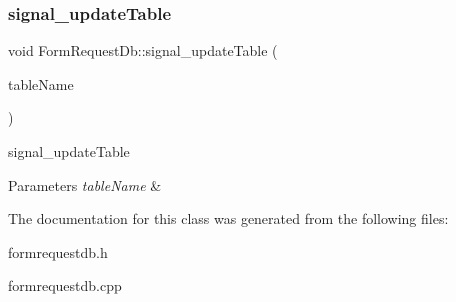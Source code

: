 \subsubsection{\texorpdfstring{signal\+\_\+update\+Table}{signal\_updateTable}}
{\footnotesize\ttfamily void Form\+Request\+Db\+::signal\+\_\+update\+Table (\begin{DoxyParamCaption}\item[{const Q\+String \&}]{table\+Name }\end{DoxyParamCaption})\hspace{0.3cm}{\ttfamily [signal]}}



signal\+\_\+update\+Table 


\begin{DoxyParams}{Parameters}
{\em table\+Name} & \\
\hline
\end{DoxyParams}


The documentation for this class was generated from the following files\+:\begin{DoxyCompactItemize}
\item 
formrequestdb.\+h\item 
formrequestdb.\+cpp\end{DoxyCompactItemize}
